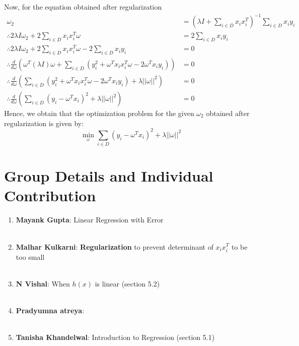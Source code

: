 \documentclass[11pt, twosides]{article}
\begin{document}
Now, for the equation obtained after regularization
\begin{align*}
    \omega_2 &= (\lambda I + \sum_{i \in D} x_ix_i^T)^{-1} \sum_{i \in D} x_iy_i \\
    \therefore 2\lambda I \omega_2 + 2\sum_{i \in D} x_ix_i^T \omega &= 2\sum_{i \in D} x_iy_i\\
    \therefore 2\lambda I \omega_2 + 2\sum_{i \in D} x_ix_i^T \omega - 2\sum_{i \in D} x_iy_i &= 0\\
    \therefore \frac{d}{d\omega} (\omega^T (\lambda I) \omega + \sum_{i \in D} (y_i^2 + \omega^T x_ix_i^T \omega - 2\omega^Tx_iy_i)) &= 0\\
    \therefore \frac{d}{d\omega} (\sum_{i \in D} (y_i^2 + \omega^T x_ix_i^T \omega - 2\omega^Tx_iy_i) + \lambda ||\omega||^2) &= 0\\
    \therefore \frac{d}{d\omega} (\sum_{i \in D} (y_i - \omega^T x_i)^2 + \lambda ||\omega||^2) &= 0
\end{align*}
Hence, we obtain that the optimization problem for the given $\omega_2$ obtained after regularization is given by:\\
\color{blue}
\begin{equation*}
    \min_{\omega} \sum_{i \in D} (y_i - \omega^Tx_i)^2 + \lambda ||\omega||^2
\end{equation*}
\color{black}
\section{Group Details and Individual Contribution}
\begin{enumerate}
    \item {\bf Mayank Gupta}: Linear Regression with Error\\
    \\
    \item {\bf Malhar Kulkarni}: {\bf Regularization} to prevent determinant of $x_ix_i^T$ to be too small\\
    \\
    \item {\bf N Vishal}: When $h(x)$ is linear (section 5.2)\\
    \\
    \item {\bf Pradyumna atreya}:\\
    \\
    \item {\bf Tanisha Khandelwal}: Introduction to Regression (section 5.1)\\
    \\
\end{enumerate}
\end{document}
